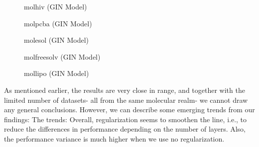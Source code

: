 \begin{figure}
    \centering
    \caption{molhiv (GIN Model)}
    \label{fig:gcn-molfreesolv}
\end{figure}

\begin{figure}
    \centering
    \caption{molpcba (GIN Model)}
    \label{fig:gcn-molfreesolv}
\end{figure}

\begin{figure}
    \centering
    \caption{molesol (GIN Model)}
    \label{fig:gcn-molfreesolv}
\end{figure}

\begin{figure}
    \centering
    \caption{molfreesolv (GIN Model)}
    \label{fig:gcn-molfreesolv}
\end{figure}

\begin{figure}
    \centering
    \caption{mollipo (GIN Model)}
    \label{fig:gcn-molfreesolv}
\end{figure}



As mentioned earlier, the results are very close in range, and together with the limited number of datasets- all from the same molecular realm- we cannot draw any general conclusions. However, we can describe some emerging trends from our findings:
The trends:
Overall, regularization seems to smoothen the line, i.e., to reduce the differences in performance depending on the number of layers. Also, the performance variance is much higher when we use no regularization.


